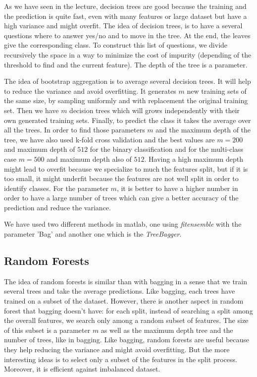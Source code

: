 \documentclass{article} %
\begin{document}
As we have seen in the lecture, decision trees are good because the training and the prediction is quite fast, even with many features or large dataset but have a high variance and might overfit. The idea of decision trees, is to have a several questions where to answer yes/no and to move in the tree. At the end, the leaves give the corresponding class. To construct this list of questions, we divide recursively the space in a way to minimize the cost of impurity (depending of the threshold to find and the current feature). The depth of the tree is a parameter.

The idea of bootstrap aggregation is to average several decision trees. It will help to reduce the variance and avoid overfitting. It generates $m$ new training sets of the same size, by sampling uniformly and with replacement the original training set. Then we have $m$ decision trees which will grows independently with their own generated training sets. Finally, to predict the class it takes the average over all the trees. In order to find those parameters $m$ and the maximum depth of the tree, we have also used k-fold cross validation and the best values are $m = 200$ and maximum depth of $512$ for the binary classification and for the multi-class case $m = 500$ and maximum depth also of $512$. Having a high maximum depth might lead to overfit because we specialize to much the features split, but if it is too small, it might underfit because the features are not well split in order to identify classes. For the parameter $m$, it is better to have a higher number in order to have a large number of trees which can give a better accuracy of the prediction and reduce the variance.

We have used two different methods in matlab, one using \textit{fitensemble} with the parameter 'Bag' and another one which is the \textit{TreeBagger}.

\subsection{Random Forests}

The idea of random forests is similar than with bagging in a sense that we train several trees and take the average predictions. Like bagging, each trees have trained on a subset of the dataset. However, there is another aspect in random forest that bagging doesn't have: for each split, instead of searching a split among the overall features, we search only among a random subset of features. The size of this subset is a parameter $m$ as well as the maximum depth tree and the number of trees, like in bagging. Like bagging, random forests are useful because they help reducing the variance and might avoid overfitting. But the more interesting ideas is to select only a subset of the features in the split process. Moreover, it is efficient against imbalanced dataset.
\end{document}

